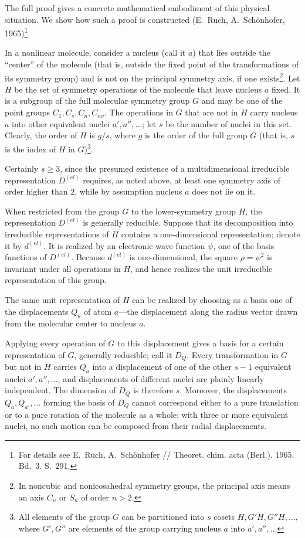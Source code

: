 The full proof gives a concrete mathematical embodiment of this physical situation. We show how such a proof is constructed (E.~Ruch, A.~Schönhofer, 1965)\footnote{For details see E.~Ruch, A.~Schönhofer // Theoret. chim. acta (Berl.). 1965. Bd.~3. S.~291.}.

In a nonlinear molecule, consider a nucleus (call it $a$) that lies outside the ``center'' of the molecule (that is, outside the fixed point of the transformations of its symmetry group) and is not on the principal symmetry axis, if one exists\footnote{In noncubic and nonicosahedral symmetry groups, the principal axis means an axis $C_n$ or $S_n$ of order $n>2$.}. Let $H$ be the set of symmetry operations of the molecule that leave nucleus $a$ fixed. It is a subgroup of the full molecular symmetry group $G$ and may be one of the point groups $C_1,C_s,C_n,C_{nv}$. The operations in $G$ that are not in $H$ carry nucleus $a$ into other equivalent nuclei $a',a'',\ldots$; let $s$ be the number of nuclei in this set. Clearly, the order of $H$ is $g/s$, where $g$ is the order of the full group $G$ (that is, $s$ is the index of $H$ in $G$)\footnote{All elements of the group $G$ can be partitioned into $s$ cosets $H,G'H,G''H,\ldots$, where $G',G''$ are elements of the group carrying nucleus $a$ into $a',a'',\ldots$}.

Certainly $s\geqslant3$, since the presumed existence of a multidimensional irreducible representation $D^{(el)}$ requires, as noted above, at least one symmetry axis of order higher than 2, while by assumption nucleus $a$ does not lie on it.

When restricted from the group $G$ to the lower-symmetry group $H$, the representation $D^{(el)}$ is generally reducible. Suppose that its decomposition into irreducible representations of $H$ contains a one-dimensional representation; denote it by $d^{(el)}$. It is realized by an electronic wave function $\psi$, one of the basis functions of $D^{(el)}$. Because $d^{(el)}$ is one-dimensional, the square $\rho=\psi^2$ is invariant under all operations in $H$, and hence realizes the unit irreducible representation of this group.

The same unit representation of $H$ can be realized by choosing as a basis one of the displacements $Q_a$ of atom $a$---the displacement along the radius vector drawn from the molecular center to nucleus $a$.

Applying every operation of $G$ to this displacement gives a basis for a certain representation of $G$, generally reducible; call it $D_Q$. Every transformation in $G$ but not in $H$ carries $Q_a$ into a displacement of one of the other $s-1$ equivalent nuclei $a',a'',\ldots$, and displacements of different nuclei are plainly linearly independent. The dimension of $D_Q$ is therefore $s$. Moreover, the displacements $Q_a,Q_{a'},\ldots$ forming the basis of $D_Q$ cannot correspond either to a pure translation or to a pure rotation of the molecule as a whole: with three or more equivalent nuclei, no such motion can be composed from their radial displacements.

